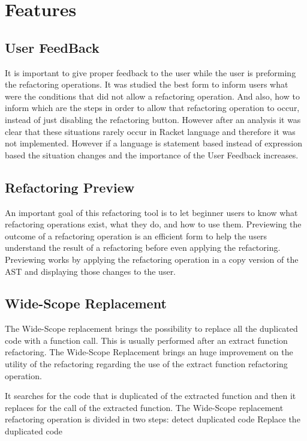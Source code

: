 \section{Features}

\subsection{User FeedBack}
It is important to give proper feedback to the user while the user is preforming
the refactoring operations.
It was studied the best form to inform users what were the conditions that did not allow %
a refactoring operation.
And also, how to inform which are the steps in order to allow that refactoring operation to occur,
instead of just disabling the refactoring button.
However after an analysis it was clear that these situations rarely occur
in Racket language and therefore it was not implemented.
However if a language is statement based instead of expression based the situation changes
and the importance of the User Feedback increases. %

\subsection{Refactoring Preview}
An important goal of this refactoring tool is to let beginner users to know what
refactoring operations exist, what they do, and how to use them.
Previewing the outcome of a refactoring operation is an efficient form to
help the users understand the result of a refactoring before even applying the refactoring. %
Previewing works by applying the refactoring operation in a copy version of the AST
and displaying those changes to the user.

\subsection{Wide-Scope Replacement} %
The Wide-Scope replacement brings the possibility to replace all the duplicated
code with a function call. This is usually performed after an extract function refactoring.
The Wide-Scope Replacement brings an huge improvement on the utility of the refactoring regarding the use
of the extract function refactoring operation.

It searches for the code that is duplicated of the extracted function and then it replaces for the call of the
extracted function.
The Wide-Scope replacement refactoring operation is divided in two steps: %
detect duplicated code
Replace the duplicated code

